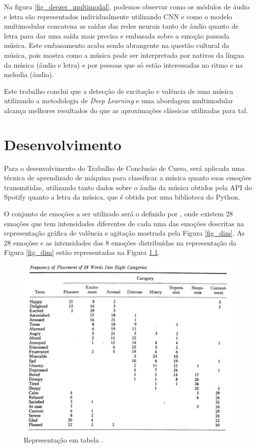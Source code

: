 \documentclass[
	12pt,				%
	openright,			%
	oneside,
	a4paper,			%
	english,			%
	french,				%
	spanish,			%
	brazil				%
	]{abntex2}
\begin{document}
        Na figura \ref{fig_deezer_multimodal}, podemos observar como os módulos de áudio e letra são representados individualmente utilizando CNN e como o modelo multimodular concatena as saídas das redes neurais tanto de áudio quanto de letra para dar uma saída mais precisa e embasada sobre a emoção passada música. Este embasamento acaba sendo abrangente na questão cultural da música, pois mostra como a música pode ser interpretada por nativos da língua da música (áudio e letra) e por pessoas que só estão interessadas no ritmo e na melodia (áudio).
    
        Este trabalho conclui que a detecção de excitação e valência de uma música utilizando a metodologia de \textit{Deep Learning} e uma abordagem multimodular alcança melhores resultados do que as aproximações clássicas utilizadas para tal.

\chapter[Desenvolvimento]{Desenvolvimento}
    Para o desenvolvimento do Trabalho de Conclusão de Curso, será aplicada uma técnica de aprendizado de máquina para classificar a música quanto suas emoções transmitidas, utilizando tanto dados sobre o áudio da música obtidos pela API do Spotify quanto a letra da música, que é obtida por uma biblioteca do Python. 
    
    O conjunto de emoções a ser utilizado será o definido por \cite{russell1980circumplex}, onde existem 28 emoções que tem intensidades diferentes de cada uma das emoções descritas na representação gráfica de valência e agitação mostrada pela Figura \ref{fig_dim}. As 28 emoções e as intensidades das 8 emoções distribuídas na representação da Figura \ref{fig_dim} estão representadas na Figura \ref{fig_emotion_table}.
    
    \begin{figure}[H]
        \caption{\label{fig_emotion_table} Representação em tabela .}
        \includegraphics[width=\textwidth]{3DC01B5E-5237-4172-8E7D-3200AB0E0026.jpeg}
    \end{figure}
    
\end{document}
